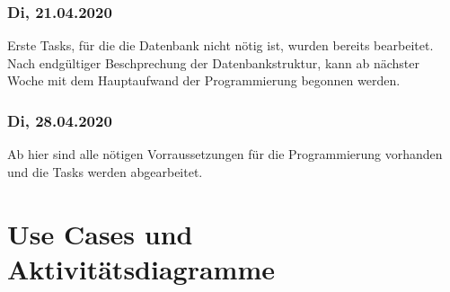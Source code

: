 \subsection{Di, 21.04.2020}
Erste Tasks, für die die Datenbank nicht nötig ist, wurden bereits bearbeitet.
Nach endgültiger Beschprechung der Datenbankstruktur, kann ab nächster Woche mit dem Hauptaufwand der Programmierung begonnen werden.
\subsection{Di, 28.04.2020}
Ab hier sind alle nötigen Vorraussetzungen für die Programmierung vorhanden und die Tasks werden abgearbeitet.
\newpage

\chapter{Use Cases und Aktivitätsdiagramme}
